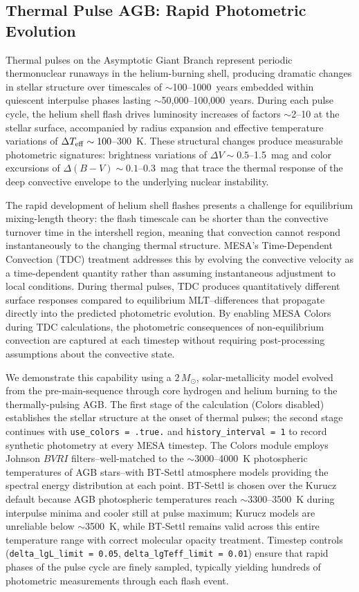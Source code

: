 \documentclass[linenumbers,apj,twocolumn, floatfix]{aastex701}
\begin{document}
\subsection{Thermal Pulse AGB: Rapid Photometric Evolution}
\label{sec:demo_tp_agb}

Thermal pulses on the Asymptotic Giant Branch represent periodic thermonuclear runaways in the helium-burning shell, producing dramatic changes in stellar structure over timescales of $\sim$100--1000~years embedded within quiescent interpulse phases lasting $\sim$50,000--100,000~years. 
During each pulse cycle, the helium shell flash drives luminosity increases of factors $\sim$2--10 at the stellar surface, accompanied by radius expansion and effective temperature variations of $\Delta T_{\rm eff} \sim 100$--300~K. 
These structural changes produce measurable photometric signatures: brightness variations of $\Delta V \sim 0.5$--1.5~mag and color excursions of $\Delta(B-V) \sim 0.1$--0.3~mag that trace the thermal response of the deep convective envelope to the underlying nuclear instability.

The rapid development of helium shell flashes presents a challenge for equilibrium mixing-length theory: the flash timescale can be shorter than the convective turnover time in the intershell region, meaning that convection cannot respond instantaneously to the changing thermal structure.
MESA's Time-Dependent Convection (TDC) treatment \citep{MESAV} addresses this by evolving the convective velocity as a time-dependent quantity rather than assuming instantaneous adjustment to local conditions.
During thermal pulses, TDC produces quantitatively different surface responses compared to equilibrium MLT--differences that propagate directly into the predicted photometric evolution.
By enabling MESA Colors during TDC calculations, the photometric consequences of non-equilibrium convection are captured at each timestep without requiring post-processing assumptions about the convective state.

We demonstrate this capability using a $2\,M_\odot$, solar-metallicity model evolved from the pre-main-sequence through core hydrogen and helium burning to the thermally-pulsing AGB.
The first stage of the calculation (Colors disabled) establishes the stellar structure at the onset of thermal pulses; the second stage continues with \texttt{use\_colors = .true.} and \texttt{history\_interval = 1} to record synthetic photometry at every MESA timestep.
The Colors module employs Johnson $BVRI$ filters--well-matched to the $\sim$3000--4000~K photospheric temperatures of AGB stars--with BT-Settl atmosphere models providing the spectral energy distribution at each point. BT-Settl is chosen over the Kurucz default because AGB photospheric temperatures reach $\sim$3300--3500~K during interpulse minima and cooler still at pulse maximum; Kurucz models are unreliable below $\sim$3500~K, while BT-Settl remains valid across this entire temperature range with correct molecular opacity treatment.
Timestep controls (\texttt{delta\_lgL\_limit = 0.05}, \texttt{delta\_lgTeff\_limit = 0.01}) ensure that rapid phases of the pulse cycle are finely sampled, typically yielding hundreds of photometric measurements through each flash event.
\end{document}
